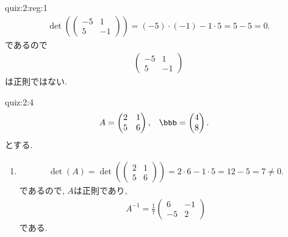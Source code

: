 \begin{answerof}{quiz:2:reg:1}
  \begin{align*}
    \det(\begin{pmatrix}
      -5&1\\5&-1
    \end{pmatrix})=(-5)\cdot(-1) -1\cdot 5=5-5=0.
  \end{align*}
  であるので
  \begin{align*}
    \begin{pmatrix}
      -5&1\\5&-1
    \end{pmatrix}
  \end{align*}
  は正則ではない.
\end{answerof}


\begin{answerof}{quiz:2:4}
  \begin{align*}
    A&=\begin{pmatrix}
      2&1\\5&6
    \end{pmatrix},&
    \bbb&=\begin{pmatrix}
      4\\8
    \end{pmatrix}.   
  \end{align*}
  とする.
\begin{enumerate}
\item
  \begin{align*}
    \det(A)=
    \det(\begin{pmatrix}
      2&1\\5&6
    \end{pmatrix})=2\cdot 6 -1\cdot 5=12-5=7\neq 0.
  \end{align*}
  であるので,
  $A$は正則であり,
  \begin{align*}
     A^{-1}=
     \frac{1}{7}
     \begin{pmatrix}
      6&-1\\-5&2
    \end{pmatrix}
  \end{align*}
  である.


\end{enumerate}
\end{answerof}
